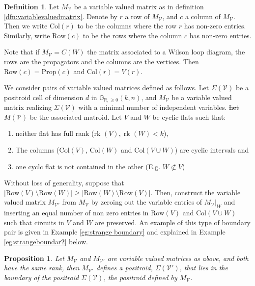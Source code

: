 \documentclass[11pt]{article}
\newcommand{\R}{\mathbb{R}}
\newcommand{\Gr}{\mathbb{G}_{\R, \geq 0}}
\newcommand{\rk}{\textrm{rk }}
\newcommand{\cV}{\mathcal{V}}
\newcommand{\Prop}{\textrm{Prop}}
\newcommand{\Rows}{\textrm{Row}}
\newcommand{\Cols}{\textrm{Col}}
\newtheorem{prop}[thm]{Proposition}
\theoremstyle{remark}
\theoremstyle{definition}
\newtheorem{dfn}[thm]{Definition}
\begin{document}
\begin{dfn}
Let $M_{\mathcal{V}}$ be a variable valued matrix as in definition \ref{dfn:variablevaluedmatrix}. Denote by $r$ a row of $M_{\cV}$, and $c$ a column of $M_{\cV}$. Then we write $\Cols(r)$ to be the columns where the row $r$ has non-zero entries. Similarly, write $\Rows(c)$ to be the rows where the column $c$ has non-zero entries. 
\end{dfn}

Note that if $M_{\mathcal{V}} = C(W)$ the matrix associated to a Wilson loop diagram, the rows are the propagators and the columns are the vertices. Then $\Rows(c) = \Prop(c)$ and $\Cols(r) = V(r)$.

We consider pairs of variable valued matrices defined as follows. Let $\Sigma(\cV)$ be a positroid cell of dimension $d$ in $\Gr(k,n)$, and $M_\cV$ be a variable valued matrix realizing $\Sigma(\cV)$ with a minimal number of independent variables. \st{Let $M(\cV)$ be the associated matroid.} Let $V$ and $W$ be cyclic flats such that: \begin{enumerate} \item neither flat has full rank ($\rk (V), \; \rk(W) <k$), \item  The columns ($\Cols(V)$, $\Cols(W)$ and $\Cols(V \cup W)$) are cyclic intervals and \item one cyclc flat is not contained in the other (E.g. $W \not \subset V$) \end{enumerate}  Without loss of generality, suppose that $|\Rows(V) \setminus \Rows(W)| \geq |\Rows(W) \setminus \Rows(V)|$. Then, construct the variable valued matrix $M_{\cV'}$ from $M_\cV$ by zeroing out the variable entries of $M_\cV|_{W}$ and inserting an equal number of non zero entries in $\Rows(V)$ and $\Cols(V\cup W)$ such that circuits in $V$ and $W$ are preserved. An example of this type of boundary pair is given in Example \ref{eg:strange boundary} and explained in Example \ref{eg:strangeboundar2} below.


\begin{prop}\label{res:moving variables}
Let $M_\cV$ and $M_{\cV'}$ are variable valued matrices as above, and both have the same rank, then $M_{\cV'}$ defines a positroid, $\Sigma(\cV')$, that lies in the boundary of the positroid $\Sigma(\cV)$, the positroid defined by $M_\cV$. \end{prop}
\end{document}
